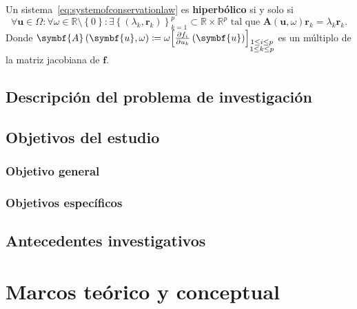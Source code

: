 \begin{definition}
	Un sistema~\eqref{eq:systemofconservationlaw} es
	\textbf{hiperbólico} si y solo si
	\begin{equation}
		\forall\symbf{u}\in\Omega\!:
		\forall\omega\in\mathbb{R}\setminus\left\{0\right\}\!:
		\exists
		{\left\{
			\left(\lambda_{k},\symbf{r}_{k}\right)
			\right\}}^{p}_{k=1}\subset
		\mathbb{R}\times\mathbb{R}^{p}
		\text{ tal que }
		\symbf{A}\left(\symbf{u},\omega\right)
		\symbf{r}_{k}=
		\lambda_{k}
		\symbf{r}_{k}.
	\end{equation}
	Donde
	\begin{math}
		\symbf{A}\left(\symbf{u},\omega\right)\coloneqq
		\omega
		{
			\begin{bmatrix}
				\diffp{f_{i}}{u_{k}}
				\left(\symbf{u}\right)
			\end{bmatrix}}_{\substack{1\leq i\leq p\\1\leq k\leq p}}
	\end{math}
	es un múltiplo de la matriz jacobiana de $\mathbf{f}$.
\end{definition}

\section{Descripción del problema de investigación}

\section{Objetivos del estudio}

\subsection{Objetivo general}

\subsection{Objetivos específicos}

\section{Antecedentes investigativos}

\chapter{Marcos teórico y conceptual}

